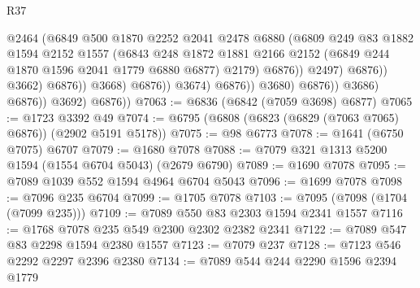 \begin{lexlean}{R37}
\begin{coremodule}
                                              @2464
                                              (@6849
                                                @500
                                                @1870
                                                @2252
                                                @2041
                                                @2478
                                                @6880
                                                (@6809
                                                  @249
                                                  @83
                                                  @1882
                                                  @1594
                                                  @2152
                                                  @1557
                                                  (@6843
                                                    @248
                                                    @1872
                                                    @1881
                                                    @2166
                                                    @2152
                                                    (@6849 @244 @1870 @1596 @2041 @1779 @6880 @6877)
                                                    @2179)
                                                  @6876))
                                              @2497)
                                            @6876))
                                        @3662)
                                      @6876))
                                  @3668)
                                @6876))
                            @3674)
                          @6876))
                      @3680)
                    @6876))
                @3686)
              @6876))
          @3692)
        @6876))
@7063 := @6836 (@6842 (@7059 @3698) @6877)
@7065 := @1723 @3392 @49
@7074 := @6795 (@6808 (@6823 (@6829 (@7063 @7065) @6876)) (@2902 @5191 @5178))
@7075 := @98 @6773
@7078 := @1641 (@6750 @7075) @6707
@7079 := @1680 @7078
@7088 := @7079 @321 @1313 @5200 @1594 (@1554 @6704 @5043) (@2679 @6790)
@7089 := @1690 @7078
@7095 := @7089 @1039 @552 @1594 @4964 @6704 @5043
@7096 := @1699 @7078
@7098 := @7096 @235 @6704
@7099 := @1705 @7078
@7103 := @7095 (@7098 (@1704 (@7099 @235)))
@7109 := @7089 @550 @83 @2303 @1594 @2341 @1557
@7116 := @1768 @7078 @235 @549 @2300 @2302 @2382 @2341
@7122 := @7089 @547 @83 @2298 @1594 @2380 @1557
@7123 := @7079 @237
@7128 := @7123 @546 @2292 @2297 @2396 @2380
@7134 := @7089 @544 @244 @2290 @1596 @2394 @1779

\end{coremodule}
\end{lexlean}
